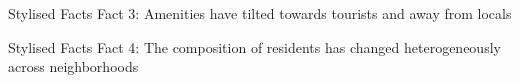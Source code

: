 \begin{frame}{Stylised Facts}
    Fact 3: Amenities have tilted towards tourists and away from locals
    \begin{figure}
        \centering
        \caption{}
        \label{fig:photo}
    \end{figure}
\end{frame}

\begin{frame}{Stylised Facts}
    Fact 4: The composition of residents has changed heterogeneously across neighborhoods
    \begin{figure}
        \centering
        \caption{}
        \label{fig:photo}
    \end{figure}
\end{frame}

